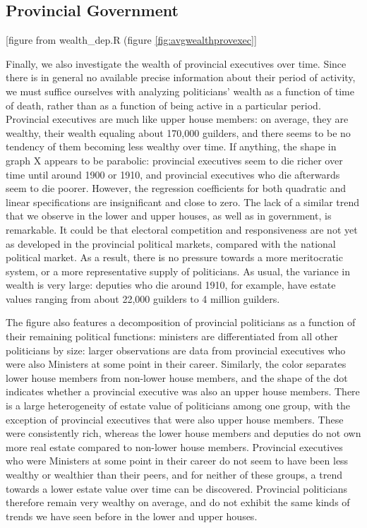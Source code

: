 \subsection{Provincial Government}
\begin{center}    
    [figure from wealth\_dep.R (figure \ref{fig:avgwealthprovexec}]
 \end{center}   
    Finally, we also investigate the wealth of provincial executives over time. Since there is in general no available precise information about their period of activity, we must suffice ourselves with analyzing politicians' wealth as a function of time of death, rather than as a function of being active in a particular period. Provincial executives are much like upper house members: on average, they are wealthy, their wealth equaling about 170,000 guilders, and there seems to be no tendency of them becoming less wealthy over time. If anything, the shape in graph X appears to be parabolic: provincial executives seem to die richer over time until around 1900 or 1910, and provincial executives who die afterwards seem to die poorer. However, the regression coefficients for both quadratic and linear specifications are insignificant and close to zero. The lack of a similar trend that we observe in the lower and upper houses, as well as in government, is remarkable. It could be that electoral competition and responsiveness are not yet as developed in the provincial political markets, compared with the national political market. As a result, there is no pressure towards a more meritocratic system, or a more representative supply of politicians. As usual, the variance in wealth is very large: deputies who die around 1910, for example, have estate values ranging from about 22,000 guilders to 4 million guilders. 
    
    The figure also features a decomposition of provincial politicians as a function of their remaining political functions: ministers are differentiated from all other politicians by size: larger observations are data from provincial executives who were also Ministers at some point in their career. Similarly, the color separates lower house members from non-lower house members, and the shape of the dot indicates whether a provincial executive was also an upper house members. There is a large heterogeneity of estate value of politicians among one group, with the exception of provincial executives that were also upper house members. These were consistently rich, whereas the lower house members and deputies do not own more real estate compared to non-lower house members. Provincial executives who were Ministers at some point in their career do not seem to have been less wealthy or wealthier than their peers, and for neither of these groups, a trend towards a lower estate value over time can be discovered. Provincial politicians therefore remain very wealthy on average, and do not exhibit the same kinds of trends we have seen before in the lower and upper houses. 

